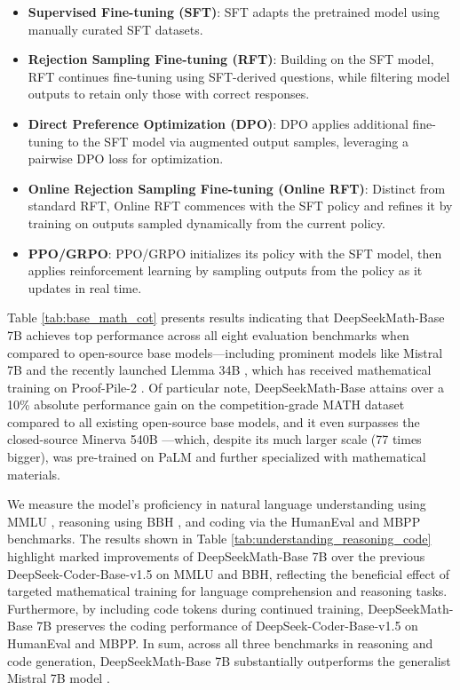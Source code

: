 \begin{itemize}
    \item \textbf{Supervised Fine-tuning (SFT)}: SFT adapts the pretrained model using manually curated SFT datasets.
    \item \textbf{Rejection Sampling Fine-tuning (RFT)}: Building on the SFT model, RFT continues fine-tuning using SFT-derived questions, while filtering model outputs to retain only those with correct responses.
    \item \textbf{Direct Preference Optimization (DPO)}: DPO applies additional fine-tuning to the SFT model via augmented output samples, leveraging a pairwise DPO loss for optimization.
    \item \textbf{Online Rejection Sampling Fine-tuning (Online RFT)}: Distinct from standard RFT, Online RFT commences with the SFT policy and refines it by training on outputs sampled dynamically from the current policy.
    \item \textbf{PPO/GRPO}: PPO/GRPO initializes its policy with the SFT model, then applies reinforcement learning by sampling outputs from the policy as it updates in real time.
\end{itemize}

Table \ref{tab:base_math_cot} presents results indicating that DeepSeekMath-Base 7B achieves top performance across all eight evaluation benchmarks when compared to open-source base models—including prominent models like Mistral 7B \citep{mistral} and the recently launched Llemma 34B \citep{llemma}, which has received mathematical training on Proof-Pile-2 \citep{llemma}. Of particular note, DeepSeekMath-Base attains over a 10\% absolute performance gain on the competition-grade MATH dataset compared to all existing open-source base models, and it even surpasses the closed-source Minerva 540B \citep{minerva}—which, despite its much larger scale (77 times bigger), was pre-trained on PaLM \citep{palm} and further specialized with mathematical materials.

We measure the model’s proficiency in natural language understanding using MMLU \citep{mmlu}, reasoning using BBH \citep{bbh}, and coding via the HumanEval \citep{codex} and MBPP \citep{mbpp} benchmarks. The results shown in Table \ref{tab:understanding_reasoning_code} highlight marked improvements of DeepSeekMath-Base 7B over the previous DeepSeek-Coder-Base-v1.5 \citep{deepseek-coder} on MMLU and BBH, reflecting the beneficial effect of targeted mathematical training for language comprehension and reasoning tasks. Furthermore, by including code tokens during continued training, DeepSeekMath-Base 7B preserves the coding performance of DeepSeek-Coder-Base-v1.5 on HumanEval and MBPP. In sum, across all three benchmarks in reasoning and code generation, DeepSeekMath-Base 7B substantially outperforms the generalist Mistral 7B model \citep{mistral}.

